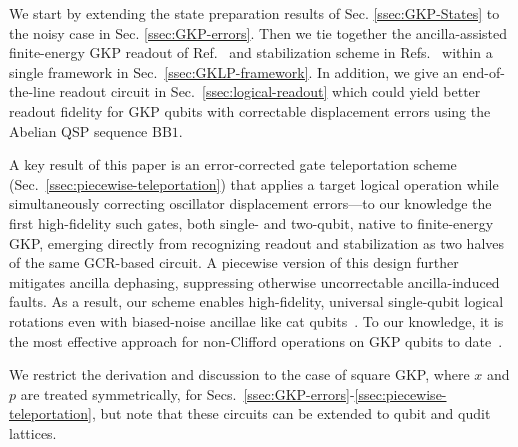 \documentclass[aps,prx,showpacs,notitlepage,twocolumn,superscriptaddress,nofootinbib,preprintnumbers,floatfix,10pt, longbibliography]{revtex4-2}
\begin{document}
We start by extending the state preparation results of Sec. \ref{ssec:GKP-States} to the noisy case in Sec. \ref{ssec:GKP-errors}. Then we tie together the ancilla-assisted finite-energy GKP readout of Ref.~\cite{hastrup2021improved} and stabilization scheme in Refs.~\cite{royer2020stabilization,de2022error} within a single framework in Sec.~\ref{ssec:GKLP-framework}. 
In addition, we give an end-of-the-line readout circuit in Sec.~\ref{ssec:logical-readout} which could yield better readout fidelity for GKP qubits with correctable displacement errors using the Abelian QSP sequence $\mathrm{BB1}$. 

A key result of this paper is an error-corrected gate teleportation scheme (Sec.~\ref{ssec:piecewise-teleportation}) that applies a target logical operation while simultaneously correcting oscillator displacement errors---to our knowledge the first high-fidelity such gates, both single- and two-qubit, native to finite-energy GKP, emerging directly from recognizing readout and stabilization as two halves of the same GCR-based circuit. A piecewise version of this design further mitigates ancilla dephasing, suppressing otherwise uncorrectable ancilla-induced faults.
As a result, our scheme enables high-fidelity, universal single-qubit logical rotations even with biased-noise ancillae like cat qubits~\cite{mirrahimi2014dynamically,puri2019stabilized,grimm2020stabilization,ding2024quantum}. To our knowledge, it is the most effective approach for non-Clifford operations on GKP qubits to date~\cite{hastrup2021unsuitability}.


We restrict the derivation and discussion to the case of square GKP, where $x$ and $p$ are treated symmetrically, for Secs.~\ref{ssec:GKP-errors}-\ref{ssec:piecewise-teleportation}, but note that these circuits can be extended to qubit and qudit lattices.
\end{document}
